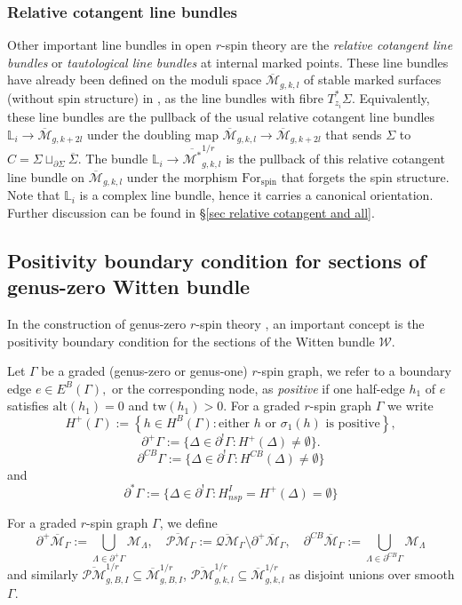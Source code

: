 \documentclass[11pt]{amsart}
\theoremstyle{definition}
\theoremstyle{remark}
\newcommand{\oPM}{{\overline{\mathcal{PM}}}^{1/r}}
\newcommand{\oPMb}{{\overline{\mathcal{PM}}}}
\newcommand{\oQMb}{{\overline{\mathcal{QM}}}}
\newcommand{\<}{\left<}
\renewcommand{\>}{\right>}
\numberwithin{equation}{section}
\def\Mbar{{\overline{\mathcal M}}}
\def\Mbarstar{{\overline{\mathcal M^*}}}
\begin{document}
\subsubsection{Relative cotangent line bundles}
Other important line bundles in open $r$-spin theory are the \emph{relative cotangent line bundles} or \emph{tautological line bundles} at internal marked points. These line bundles have already been defined on the moduli space $\Mbar_{g,k,l}$ of stable marked surfaces (without spin structure) in \cite{PST14}, as the line bundles with fibre $T^*_{z_i}\Sigma$. Equivalently, these line bundles are the pullback of the usual relative cotangent line bundles ${\mathbb{L}}_i\to\Mbar_{g,k+2l}$ under the doubling map $\Mbar_{g,k,l} \to \Mbar_{g,k+2l}$ that sends $\Sigma$ to $C=\Sigma\sqcup_{\partial\Sigma}\overline{\Sigma}$.  The bundle $\mathbb{L}_i\to\Mbarstar_{g,k,l}^{1/r}$ is the pullback of this relative cotangent line bundle on $\Mbar_{g,k,l}$ under the morphism $\text{For}_{\text{spin}}$ that forgets the spin structure.  Note that $\mathbb{L}_i$ is a complex line bundle, hence it carries a canonical orientation. Further discussion can be found in \S \ref{sec relative  cotangent and all}.

\subsection{Positivity boundary condition for sections of genus-zero Witten bundle}\label{sec positivity constraint}

In the construction of genus-zero $r$-spin theory \cite{BCT2,TZ2}, an important concept is the positivity boundary condition for the sections of the Witten bundle $\mathcal W$.


Let $\Gamma$ be a graded (genus-zero or genus-one) $r$-spin graph, we refer to a boundary edge $e\in E^B(\Gamma),$ or the corresponding node, as \textit{positive} if one half-edge $h_1$ of $e$ satisfies ${\text{alt}}(h_1) = 0$ and $\text{tw}(h_1) >0$.  For a graded $r$-spin graph $\Gamma$ we write $$H^+(\Gamma):=\left\{h\in H^B(\Gamma)\colon \text{either $h$ or $\sigma_1(h)$ is positive}\right\},$$ 
$$\partial^{+} \Gamma:=\{ {\Delta} \in \partial^{!} \Gamma \colon H^+({\Delta})\ne \emptyset \}.$$
$$\partial^{CB} \Gamma:=\{ {\Delta} \in \partial^{!} \Gamma \colon H^{CB}({\Delta})\ne \emptyset \}$$
and
$$
\partial^* \Gamma:= \{ {\Delta} \in \partial^! \Gamma \colon H^I_{nsp}=H^+({\Delta})= \emptyset \}
$$


For a graded $r$-spin graph $\Gamma$, we define
\[ \partial^+\Mbar_\Gamma:=\bigcup_{\Lambda\in\partial^+\Gamma}{\mathcal{M}}_\Lambda, \quad  \oPMb_\Gamma:= \oQMb_\Gamma\setminus
\partial^+\Mbar_\Gamma,\quad \partial^{CB}\Mbar_\Gamma:=\bigcup_{\Lambda\in\partial^{CB}\Gamma}{\mathcal{M}}_\Lambda\]
and similarly $\oPM_{g,B,I}\subseteq \Mbar^{1/r}_{g,B,I}$, $\oPM_{g,k,l}\subseteq \Mbar^{1/r}_{g,k,l}$ as disjoint unions over smooth $\Gamma$.
\end{document}
